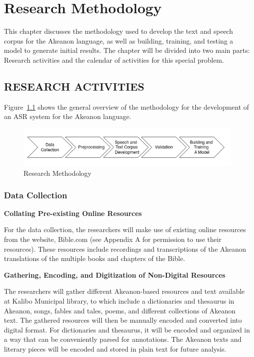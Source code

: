 \chapter{Research Methodology}
This chapter discusses the methodology used to develop the text and speech corpus for the Akeanon language, as well as building, training, and testing a model to generate initial results. The chapter will be divided into two main parts: Research activities and the calendar of activities for this special problem.

\section{RESEARCH ACTIVITIES}
Figure~\ref{fig:flowchart} shows the general overview of the methodology for the development of an ASR system for the Akeanon language.

\begin{figure}[h!]
	\centering
	\includegraphics[width=\textwidth]{./figures/flowchart.png}
   \caption{Research Methodology}
	\label{fig:flowchart}
\end{figure}

\subsection{Data Collection}

\textbf{Collating Pre-existing Online Resources}

For the data collection, the researchers will make use of existing online resources from the website, Bible.com (see Appendix A for permission to use their resources). These resources include recordings and transcriptions of the Akeanon translations of the multiple books and chapters of the Bible.

\textbf{Gathering, Encoding, and Digitization of Non-Digital Resources}

The researchers will gather different Akeanon-based resources and text available at Kalibo Municipal library, to which include a dictionaries and thesaurus in Akeanon, songs, fables and tales, poems, and different collections of Akeanon text. The gathered resources will then be manually encoded and converted into digital format. For dictionaries and thesaurus, it will be encoded and organized in a way that can be conveniently parsed for annotations. The Akeanon texts and literary pieces will be encoded and stored in plain text for future analysis.


